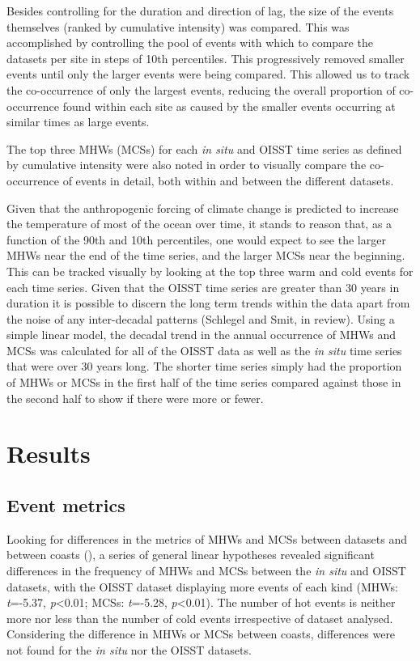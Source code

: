 \documentclass[a4paper,10pt,review]{elsarticle}
\begin{document}
Besides controlling for the duration and direction of lag, the size of the events themselves (ranked by cumulative intensity) was compared. This was accomplished by controlling the pool of events with which to compare the datasets per site in steps of 10th percentiles. This progressively removed smaller events until only the larger events were being compared. This allowed us to track the co-occurrence of only the largest events, reducing the overall proportion of co-occurrence found within each site as caused by the smaller events occurring at similar times as large events.

The top three MHWs (MCSs) for each \emph{in situ} and OISST time series as defined by cumulative intensity were also noted in order to visually compare the co-occurrence of events in detail, both within and between the different datasets.

Given that the anthropogenic forcing of climate change is predicted to increase the temperature of most of the ocean over time, it stands to reason that, as a function of the 90th and 10th percentiles, one would expect to see the larger MHWs near the end of the time series, and the larger MCSs near the beginning. This can be tracked visually by looking at the top three warm and cold events for each time series. Given that the OISST time series are greater than 30 years in duration it is possible to discern the long term trends within the data apart from the noise of any inter-decadal patterns (Schlegel and Smit, in review). Using a simple linear model, the decadal trend in the annual occurrence of MHWs and MCSs was calculated for all of the OISST data as well as the \emph{in situ} time series that were over 30 years long. The shorter time series simply had the proportion of MHWs or MCSs in the first half of the time series compared against those in the second half to show if there were more or fewer.

\section{Results}

\subsection{Event metrics}
Looking for differences in the metrics of MHWs and MCSs between datasets and between coasts (), a series of general linear hypotheses \citep{Hothorn2008} revealed significant differences in the frequency of MHWs and MCSs between the \emph{in situ} and OISST datasets, with the OISST dataset displaying more events of each kind (MHWs: \emph{t}=-5.37, \emph{p}<0.01; MCSs: \emph{t}=-5.28, \emph{p}<0.01). The number of hot events is neither more nor less than the number of cold events irrespective of dataset analysed. Considering the difference in MHWs or MCSs between coasts, differences were not found for the \emph{in situ} nor the OISST datasets.
\end{document}
